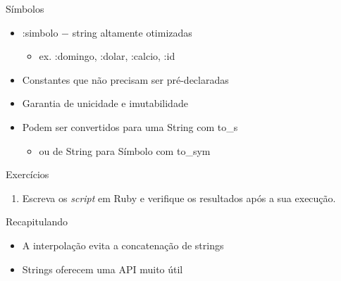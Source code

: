 \begin{frame}[fragile,t]{Símbolos}
  \begin{itemize}
    \item \alert{:simbolo} $-$ string altamente otimizadas
    \begin{itemize}
      \item ex. :domingo, :dolar, :calcio, :id
    \end{itemize}
    \item Constantes que não precisam ser pré-declaradas
    \item Garantia de \alert{unicidade} e \alert{imutabilidade}
    \item Podem ser convertidos para uma \alert{String} com \alert{to\_s} 
    \begin{itemize}
      \item ou de \alert{String} para \alert{Símbolo} com \alert{to\_sym}
    \end{itemize}
  \end{itemize}   
\end{frame}
\begin{frame}{Exercícios}
  \begin{enumerate}
    \item Escreva os \textit{script} em Ruby e verifique os resultados após a sua execução.
  \end{enumerate}
	   
\end{frame}

\begin{frame}[fragile,t]{Recapitulando}
  \begin{itemize}
    \item A interpolação evita a concatenação de strings
    \item Strings oferecem uma API muito útil
  \end{itemize}
\end{frame}



